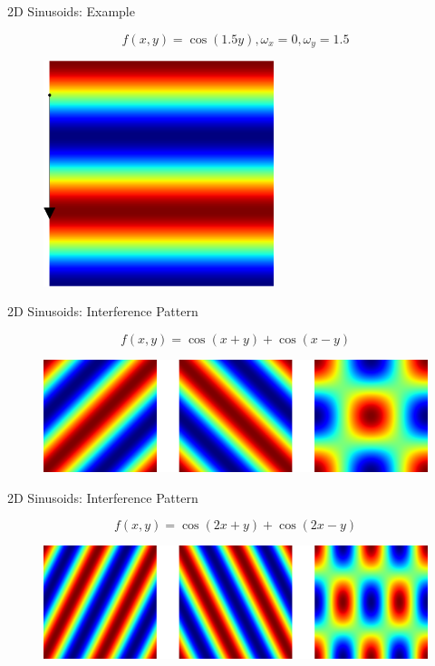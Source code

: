 \documentclass{beamer}
\begin{document}
\begin{frame}{2D Sinusoids: Example}

\[ f(x, y) = \cos( 1.5y ), \omega_x = 0, \omega_y = 1.5 \]

\begin{figure}[t]
    \includegraphics[width=0.6\textwidth]{2DPlaneWaves/0_1pt5.png}
\end{figure}

\end{frame}


\begin{frame}{2D Sinusoids: Interference Pattern}

\[ f(x, y) = \cos(x + y) + \cos(x - y) \]

\begin{figure}[t]
    \includegraphics[width=\textwidth]{2DInterference/Interference_11.png}
\end{figure}


\end{frame}

\begin{frame}{2D Sinusoids: Interference Pattern}

\[ f(x, y) = \cos(2x + y) + \cos(2x - y) \]

\begin{figure}[t]
    \includegraphics[width=\textwidth]{2DInterference/Interference_21.png}
\end{figure}


\end{frame}
\end{document}
